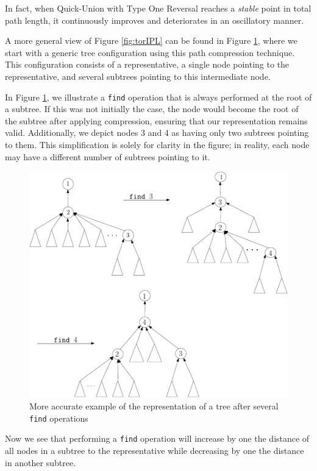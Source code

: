 In fact, when Quick-Union with Type One Reversal reaches a \textit{stable} point in total path length, it continuously improves and deteriorates in an oscillatory manner.  

A more general view of Figure \ref{fig:torIPL} can be found in Figure \ref{fig:torEx}, where we start with a generic tree configuration using this path compression technique. This configuration consists of a representative, a single node pointing to the representative, and several subtrees pointing to this intermediate node.  

In Figure \ref{fig:torEx}, we illustrate a \texttt{find} operation that is always performed at the root of a subtree. If this was not initially the case, the node would become the root of the subtree after applying compression, ensuring that our representation remains valid. Additionally, we depict nodes 3 and 4 as having only two subtrees pointing to them. This simplification is solely for clarity in the figure; in reality, each node may have a different number of subtrees pointing to it.  

\begin{figure}[ht]
    \centering
    \includegraphics[scale=0.65]{../images/torEx.pdf}
    \caption{More accurate example of the representation of a tree after several \texttt{find} operations}
    \label{fig:torEx}
\end{figure}

Now we see that performing a \texttt{find} operation will increase by one the distance of all nodes in a subtree to the representative while decreasing by one the distance in another subtree.

